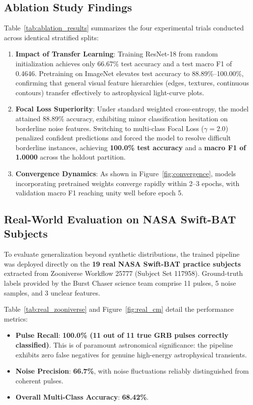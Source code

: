 \documentclass[10pt,twocolumn]{article}
\begin{document}
\subsection{Ablation Study Findings}
Table~\ref{tab:ablation_results} summarizes the four experimental trials conducted across identical stratified splits:
\begin{enumerate}
    \item \textbf{Impact of Transfer Learning}: Training ResNet-18 from random initialization achieves only 66.67\% test accuracy and a test macro F1 of 0.4646. Pretraining on ImageNet elevates test accuracy to 88.89\%--100.00\%, confirming that general visual feature hierarchies (edges, textures, continuous contours) transfer effectively to astrophysical light-curve plots.
    \item \textbf{Focal Loss Superiority}: Under standard weighted cross-entropy, the model attained 88.89\% accuracy, exhibiting minor classification hesitation on borderline noise features. Switching to multi-class Focal Loss ($\gamma = 2.0$) penalized confident predictions and forced the model to resolve difficult borderline instances, achieving \textbf{100.0\% test accuracy} and a \textbf{macro F1 of 1.0000} across the holdout partition.
    \item \textbf{Convergence Dynamics}: As shown in Figure~\ref{fig:convergence}, models incorporating pretrained weights converge rapidly within 2--3 epochs, with validation macro F1 reaching unity well before epoch 5.
\end{enumerate}

\subsection{Real-World Evaluation on NASA Swift-BAT Subjects}
To evaluate generalization beyond synthetic distributions, the trained pipeline was deployed directly on the \textbf{19 real NASA Swift-BAT practice subjects} extracted from Zooniverse Workflow 25777 (Subject Set 117958). Ground-truth labels provided by the Burst Chaser science team comprise 11 pulses, 5 noise samples, and 3 unclear features.

Table~\ref{tab:real_zooniverse} and Figure~\ref{fig:real_cm} detail the performance metrics:
\begin{itemize}
    \item \textbf{Pulse Recall}: \textbf{100.0\% (11 out of 11 true GRB pulses correctly classified)}. This is of paramount astronomical significance: the pipeline exhibits zero false negatives for genuine high-energy astrophysical transients.
    \item \textbf{Noise Precision}: \textbf{66.7\%}, with noise fluctuations reliably distinguished from coherent pulses.
    \item \textbf{Overall Multi-Class Accuracy}: \textbf{68.42\%}.
\end{itemize}
\end{document}
